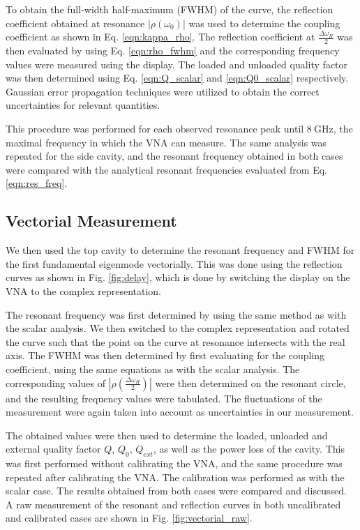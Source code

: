 \documentclass[a4paper]{article}
\numberwithin{equation}{section}
\begin{document}
To obtain the full-width half-maximum (FWHM) of the curve, the reflection
coefficient obtained at resonance $|\rho(\omega_0)|$ was used to determine the
coupling coefficient as shown in Eq. \ref{eqn:kappa_rho}. The reflection
coefficient at $\frac{\Delta\omega_H}{2}$ was then evaluated by using Eq.
\ref{eqn:rho_fwhm} and the corresponding frequency values were measured using
the display. The loaded and unloaded quality factor was then determined using Eq. \ref{eqn:Q_scalar} and
\ref{eqn:Q0_scalar} respectively. Gaussian error propagation techniques were
utilized to obtain the correct uncertainties for relevant quantities. \par 


This procedure was performed for each observed resonance peak until $\SI{8}{\giga\hertz}$, the
maximal frequency in which the VNA can measure. The same analysis was repeated
for the side cavity, and the resonant frequency obtained in both cases were
compared with the analytical resonant frequencies evaluated from Eq. \ref{eqn:res_freq}.

\subsection{Vectorial Measurement}

We then used the top cavity to determine the resonant frequency and FWHM for the
first fundamental eigenmode vectorially. This was done using the reflection
curves as shown in Fig. \ref{fig:delay}, which is done by switching the display on the VNA to the complex representation. \par 

The resonant frequency was first determined by using the same method as with the
scalar analysis. We then switched to the complex representation and rotated the
curve such that the point on the curve at resonance intersects with the real
axis. The FWHM was then determined by first evaluating for the coupling
coefficient, using the same equations as with the scalar analysis. The
corresponding values of $|\rho(\frac{\Delta\omega_H}{2})|$ were then determined
on the resonant circle, and the resulting frequency values were tabulated.
The fluctuations of the measurement were again taken into account as uncertainties
in our measurement. \par 

The obtained values were then used to determine the loaded, unloaded and external quality
factor $Q$, $Q_0$, $Q_{ext}$, as well as the power loss of the cavity. This was first
performed without calibrating the VNA, and the same procedure was repeated after
calibrating the VNA. The calibration was performed as with the scalar case. 
The results obtained from both cases were compared and discussed. A raw measurement of the resonant and reflection curves in
both uncalibrated and calibrated cases are shown in Fig.
\ref{fig:vectorial_raw}.   
\end{document}
